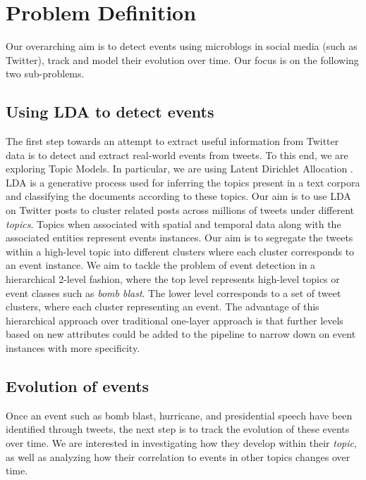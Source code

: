 \chapter{Problem Definition}

Our overarching aim is to detect events using microblogs in social media (such as Twitter), track and model their evolution over time. Our focus is on the following two sub-problems.

\section{Using LDA to detect events}
The first step towards an attempt to extract useful information from Twitter data is to detect and extract real-world events from tweets. To this end, we are exploring Topic Models. In particular, we are using Latent Dirichlet Allocation \cite{blei2003latent}. LDA is a generative process used for inferring the topics present in a text corpora and classifying the documents according to these topics. Our aim is to use LDA on Twitter posts to cluster related posts across millions of tweets under different \emph{topics}. Topics when associated with spatial and temporal data along with the associated entities represent events instances. Our aim is to segregate the tweets within a high-level topic into different clusters where each cluster corresponds to an event instance. We aim to tackle the problem of event detection in a hierarchical 2-level fashion, where the top level represents high-level topics or event classes such as \textit{bomb blast}. The lower level corresponds to a set of tweet clusters, where each cluster representing an event. The advantage of this hierarchical approach over traditional one-layer approach is that further levels based on new attributes could be added to the pipeline to narrow down on event instances with more specificity.

\section{Evolution of events}
Once an event such as bomb blast, hurricane, and presidential speech have been identified through tweets, the next step is to track the evolution of these events over time. We are interested in investigating how they develop within their \emph{topic}, as well as analyzing how their correlation to events in other topics changes over time.